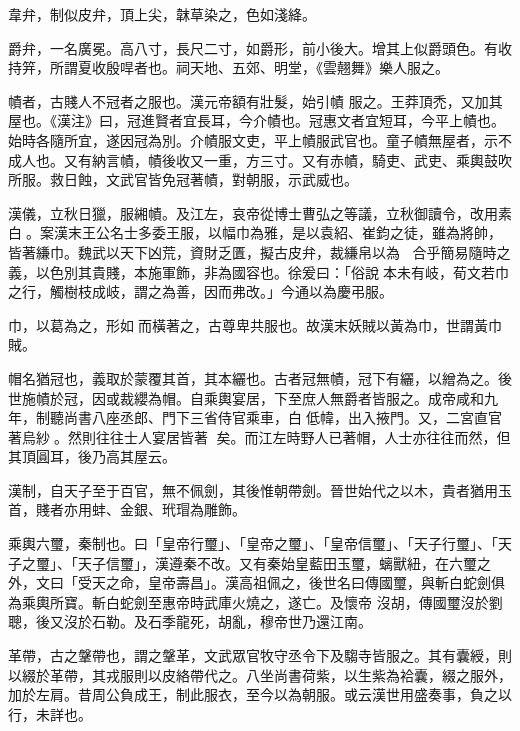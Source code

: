 \begin{pinyinscope}
 韋弁，制似皮弁，頂上尖，韎草染之，色如淺絳。



 爵弁，一名廣冕。高八寸，長尺二寸，如爵形，前小後大。增其上似爵頭色。有收持笄，所謂夏收殷哻者也。祠天地、五郊、明堂，《雲翹舞》樂人服之。



 幘者，古賤人不冠者之服也。漢元帝額有壯髮，始引幘
 服之。王莽頂禿，又加其屋也。《漢注》曰，冠進賢者宜長耳，今介幘也。冠惠文者宜短耳，今平上幘也。始時各隨所宜，遂因冠為別。介幘服文吏，平上幘服武官也。童子幘無屋者，示不成人也。又有納言幘，幘後收又一重，方三寸。又有赤幘，騎吏、武吏、乘輿鼓吹所服。救日蝕，文武官皆免冠著幘，對朝服，示武威也。



 漢儀，立秋日獵，服緗幘。及江左，哀帝從博士曹弘之等議，立秋御讀令，改用素白。案漢末王公名士多委王服，以幅巾為雅，是以袁紹、崔鈞之徒，雖為將帥，皆著縑巾。魏武以天下凶荒，資財乏匱，擬古皮弁，裁縑帛以為
 ，合乎簡易隨時之義，以色別其貴賤，本施軍飾，非為國容也。徐爰曰：「俗說本未有岐，荀文若巾之行，觸樹枝成岐，謂之為善，因而弗改。」今通以為慶弔服。



 巾，以葛為之，形如而橫著之，古尊卑共服也。故漢末妖賊以黃為巾，世謂黃巾賊。



 帽名猶冠也，義取於蒙覆其首，其本纚也。古者冠無幘，冠下有纚，以繒為之。後世施幘於冠，因或裁纓為帽。自乘輿宴居，下至庶人無爵者皆服之。成帝咸和九年，制聽尚書八座丞郎、門下三省侍官乘車，白低幃，出入掖門。又，二宮直官著烏紗。然則往往士人宴居皆著
 矣。而江左時野人已著帽，人士亦往往而然，但其頂圓耳，後乃高其屋云。



 漢制，自天子至于百官，無不佩劍，其後惟朝帶劍。晉世始代之以木，貴者猶用玉首，賤者亦用蚌、金銀、玳瑁為雕飾。



 乘輿六璽，秦制也。曰「皇帝行璽」、「皇帝之璽」、「皇帝信璽」、「天子行璽」、「天子之璽」、「天子信璽」，漢遵秦不改。又有秦始皇藍田玉璽，螭獸紐，在六璽之外，文曰「受天之命，皇帝壽昌」。漢高祖佩之，後世名曰傳國璽，與斬白蛇劍俱為乘輿所寶。斬白蛇劍至惠帝時武庫火燒之，遂亡。及懷帝
 沒胡，傳國璽沒於劉聰，後又沒於石勒。及石季龍死，胡亂，穆帝世乃還江南。



 革帶，古之鞶帶也，謂之鞶革，文武眾官牧守丞令下及騶寺皆服之。其有囊綬，則以綴於革帶，其戎服則以皮絡帶代之。八坐尚書荷紫，以生紫為袷囊，綴之服外，加於左肩。昔周公負成王，制此服衣，至今以為朝服。或云漢世用盛奏事，負之以行，未詳也。




\end{pinyinscope}
